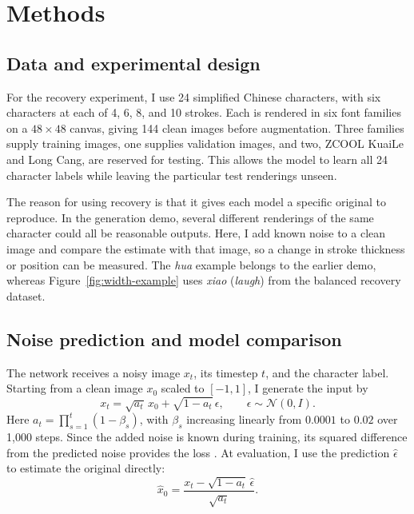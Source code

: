 \documentclass[11pt,letterpaper]{article}
\begin{document}
\section{Methods}

\subsection{Data and experimental design}

For the recovery experiment, I use 24 simplified Chinese characters, with six characters at each of 4, 6, 8, and 10 strokes. Each is rendered in six font families on a \(48\times48\) canvas, giving 144 clean images before augmentation. Three families supply training images, one supplies validation images, and two, ZCOOL KuaiLe and Long Cang, are reserved for testing. This allows the model to learn all 24 character labels while leaving the particular test renderings unseen.

The reason for using recovery is that it gives each model a specific original to reproduce. In the generation demo, several different renderings of the same character could all be reasonable outputs. Here, I add known noise to a clean image and compare the estimate with that image, so a change in stroke thickness or position can be measured. The \emph{hua} example belongs to the earlier demo, whereas Figure~\ref{fig:width-example} uses \emph{xiao} (\emph{laugh}) from the balanced recovery dataset.

\subsection{Noise prediction and model comparison}

The network receives a noisy image \(x_t\), its timestep \(t\), and the character label. Starting from a clean image \(x_0\) scaled to \([-1,1]\), I generate the input by
\begin{equation}
x_t=\sqrt{a_t}\,x_0+\sqrt{1-a_t}\,\epsilon,
\qquad \epsilon\sim\mathcal N(0,I).
\label{eq:noise}
\end{equation}
Here \(a_t=\prod_{s=1}^{t}(1-\beta_s)\), with \(\beta_s\) increasing linearly from \(0.0001\) to \(0.02\) over 1,000 steps. Since the added noise is known during training, its squared difference from the predicted noise provides the loss \cite{ho2020ddpm}. At evaluation, I use the prediction \(\widehat\epsilon\) to estimate the original directly:
\begin{equation}
\widehat x_0=\frac{x_t-\sqrt{1-a_t}\,\widehat\epsilon}{\sqrt{a_t}}.
\label{eq:estimate}
\end{equation}
\end{document}
